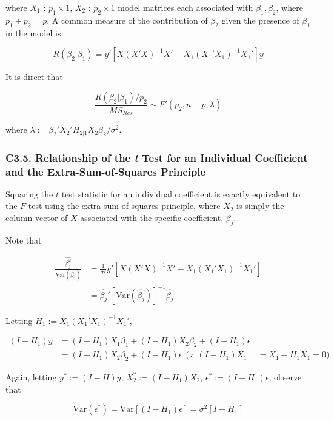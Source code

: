 \documentclass[12pt]{article}
\begin{document}
where $X_1$ : $p_1 \times 1$, $X_2$ : $p_2 \times 1$ model matrices each associated with $\beta_1, \beta_2$, where $p_1 + p_2 = p$. A common measure of the contribution of $\beta_2$ given the presence of $\beta_1$ in the model is 

$$
R( \beta_2 | \beta_1) = y' [X (X'X)^{-1}X' - X_1 (X_1' X_1)^{-1} X_1']y
$$

It is direct that 

$$
\frac{R( \beta_2 | \beta_1)/p_2}{MS_{Res}} \sim F'(p_2, n-p; \lambda)
$$

where $\lambda := \beta_2' X_2' H_{2 | 1} X_2 \beta_2/\sigma^2$.


\subsubsection*{C3.5. Relationship of the \textit{t} Test for an Individual Coefficient and the Extra-Sum-of-Squares Principle}

Squaring the $t$ test statistic for an individual coefficient is exactly equivalent to the $F$ test using the extra-sum-of-squares principle, where $X_2$ is simply the column vector of $X$ associated with the specific coefficient, $\beta_j$.

Note that 

$$
\begin{aligned}
\frac{  \hat{\beta_j^2}  }{ \mathrm{Var}(\hat{\beta_j})  } &=
\frac{1}{\sigma^2} y' [X(X'X)^{-1}X' - X_1(X_1'X_1)^{-1}X_1']  \\[8pt]
&= \hat{\beta_j}' [\mathrm{Var} ( \hat{\beta_j})]^{-1} \hat{\beta_j}
\end{aligned}
$$

Letting $H_1 := X_1 (X_1' X_1)^{-1} X_1'$,

$$
\begin{aligned}
(I - H_1)y &=  (I - H_1) X_1 \beta_1 + (I - H_1) X_2 \beta_2 + (I-H_1) \epsilon \\[10pt]
&= (I - H_1) X_2 \beta_2 + (I - H_1) \epsilon\ \ (\because \ \ (I - H_1)X_1 &= X_1 - H_1X_1 = 0)
\end{aligned}
$$


Again, letting $y^{\ast} := (I - H)y$, $X_2^{\ast} := (I- H_1) X_2$, $\epsilon^{\ast} := (I - H_1) \epsilon$, observe that

$$
\mathrm{Var} (\epsilon^{\ast} ) = \mathrm{Var} [ (I -H_1) \epsilon] = \sigma^2 [I - H_1]
$$





\pagebreak
\end{document}
